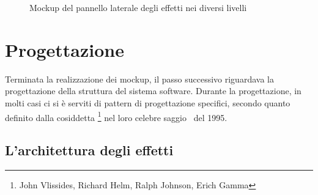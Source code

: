 \begin{description}
\begin{figure}[htbp]
{              }%
              \qquad{\LARGE$\Rightarrow$}\qquad
              \caption{Mockup del pannello laterale degli effetti nei diversi livelli\label{fig:mock:allEffects}}
          \end{figure}


        \end{description}

    \section{Progettazione}\label{sec:progettazione}
        Terminata la realizzazione dei mockup, il passo successivo riguardava la progettazione della struttura del sistema software. Durante la progettazione, in molti casi ci si è serviti di pattern di progettazione specifici, secondo quanto definito dalla cosiddetta \footnote{John Vlissides, Richard Helm, Ralph Johnson, Erich Gamma} nel loro celebre saggio~\cite{designPattern} del 1995.

        \subsection{L'architettura degli effetti}\label{sub:effetti}
